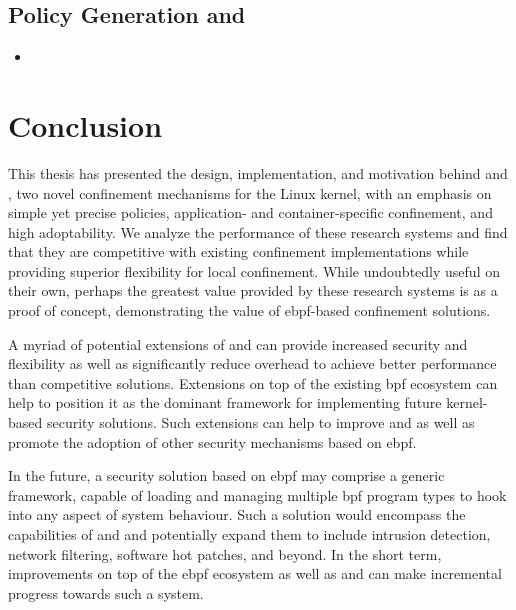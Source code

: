 \subsection{\bpfcontain{} Policy Generation and }

\begin{inprogress}
  \begin{itemize}
    \item
  \end{itemize}
\end{inprogress}



\section{Conclusion}
\label{s:disc-conclusion}

This thesis has presented the design, implementation, and motivation behind \bpfbox{} and
\bpfcontain{}, two novel confinement mechanisms for the Linux kernel, with an emphasis on
simple yet precise policies, application- and container-specific confinement, and high
adoptability. We analyze the performance of these research systems and find that they are
competitive with existing confinement implementations while providing superior flexibility
for local confinement. While undoubtedly useful on their own, perhaps the greatest value
provided by these research systems is as a proof of concept, demonstrating the value of
\gls{ebpf}-based confinement solutions.

A myriad of potential extensions of \bpfbox{} and \bpfcontain{} can provide increased
security and flexibility as well as significantly reduce overhead to achieve better
performance than competitive solutions.  Extensions on top of the existing \gls{bpf}
ecosystem can help to position it as the dominant framework for implementing future
kernel-based security solutions. Such extensions can help to improve \bpfbox{} and
\bpfcontain{} as well as promote the adoption of other security mechanisms based on
\gls{ebpf}.

In the future, a security solution based on \gls{ebpf} may comprise a generic framework,
capable of loading and managing multiple \gls{bpf} program types to hook into any aspect
of system behaviour. Such a solution would encompass the capabilities of \bpfbox{} and
\bpfcontain{} and potentially expand them to include intrusion detection, network
filtering, software hot patches, and beyond. In the short term, improvements on top of the
\gls{ebpf} ecosystem as well as \bpfbox{} and \bpfcontain{} can make incremental progress
towards such a system.
